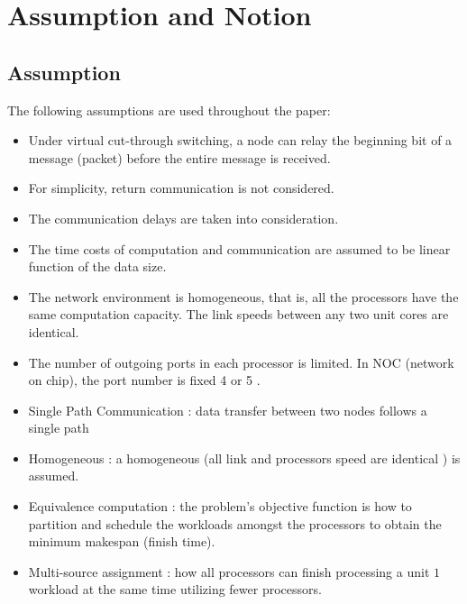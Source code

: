 \section{Assumption and Notion}

\subsection{Assumption}
The following assumptions are used throughout the paper:

\begin{itemize}
\item Under virtual cut-through switching, a node can relay the beginning bit of a message (packet) before the entire message is received. 
\item For simplicity, return communication is not considered.  
\item The communication delays are taken into consideration.  
\item The time costs of computation and communication are assumed to be linear function of the data size.  
\item The network environment is homogeneous, that is, all the processors have the same computation capacity.  The link speeds between any two unit cores are identical.   
\item The number of outgoing ports in each processor is limited.  In NOC (network on chip), the port number is fixed 4 or 5  \cite{robertazzi2017computer}.    
\item Single Path Communication : data transfer between two nodes follows a single path
\item Homogeneous : a homogeneous (all link and processors speed are identical ) is assumed.
\item Equivalence computation : the problem's objective function is how to partition and schedule the workloads amongst the processors to obtain the minimum makespan (finish time).  
\item Multi-source assignment : how all processors can finish processing a unit $1$ workload at the same time utilizing fewer processors.
\end{itemize}

